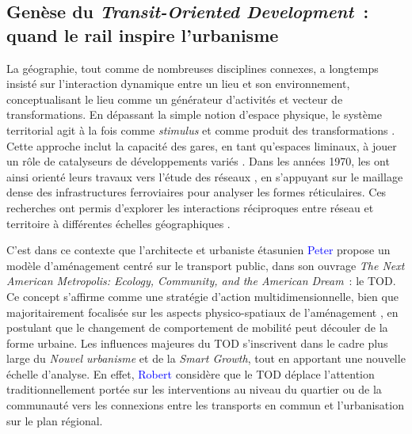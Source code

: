 \begin{refsegment}
\subsection{Genèse du \textsl{Transit-Oriented Development}~: quand le rail inspire l'urbanisme
    \label{chap1:tod-presentation-generale-origines}
    }

La géographie, tout comme de nombreuses disciplines connexes, a longtemps insisté sur l'interaction dynamique entre un lieu et son environnement, conceptualisant le lieu comme un  générateur d'activités et vecteur de transformations. En dépassant la simple notion d'espace physique, le système territorial agit à la fois comme \textsl{stimulus} et comme produit des transformations \textcolor{blue}{\autocite[19-21]{hagerstrand_what_1970}}. Cette approche inclut la capacité des gares, en tant qu’espaces liminaux, à jouer un rôle de catalyseurs de développements variés \textcolor{blue}{\autocite[6]{baron_nouvelle_2024}}. Dans les années 1970, les  ont ainsi orienté leurs travaux vers l’étude des réseaux \textcolor{blue}{\autocites{claval_nouveaux_1977}[166]{massardier_savants_1996}[112-113]{orain_geographie_2006}}, en s’appuyant sur le maillage dense des infrastructures ferroviaires pour analyser les formes réticulaires. Ces recherches ont permis d’explorer les interactions réciproques entre réseau et territoire à différentes échelles géographiques \textcolor{blue}{\autocite[6]{baron_nouvelle_2024}}.%

C’est dans ce contexte que l’architecte et urbaniste étasunien \textcolor{blue}{Peter} \textcolor{blue}{\textcite[10]{calthorpe_next_1993}} propose un modèle d’aménagement centré sur le transport public, dans son ouvrage \foreignlanguage{english}{\textsl{The Next American Metropolis: Ecology, Community, and the American Dream}}~: le \acrfull{TOD}. Ce concept s’affirme comme une stratégie d'action multidimensionnelle, bien que majoritairement focalisée sur les aspects physico-spatiaux de l’aménagement \textcolor{blue}{\autocite[10]{calthorpe_next_1993}}, en postulant que le changement de comportement de mobilité peut découler de la forme urbaine. Les influences majeures du \acrshort{TOD} s’inscrivent dans le cadre plus large du \textsl{Nouvel urbanisme} et de la \textsl{Smart Growth}, tout en apportant une nouvelle échelle d’analyse. En effet, \textcolor{blue}{Robert} \textcolor{blue}{\textcite[7]{cervero_transit_1998}} considère que le \acrshort{TOD} déplace l’attention traditionnellement portée sur les interventions au niveau du quartier ou de la communauté vers les connexions entre les transports en commun et l’urbanisation sur le plan régional.%


\end{refsegment}
